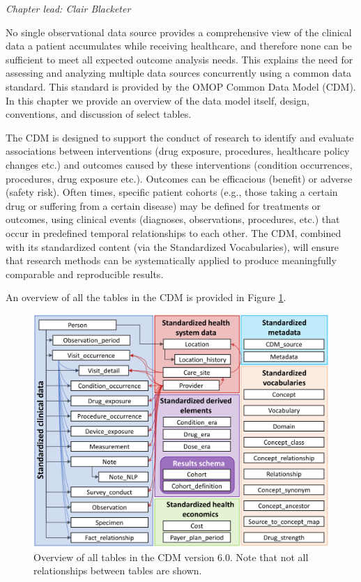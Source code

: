 \documentclass[11pt]{book}
\theoremstyle{definition}
\theoremstyle{definition}
\theoremstyle{definition}
\theoremstyle{remark}
\begin{document}
\emph{Chapter lead: Clair Blacketer}

No single observational data source provides a comprehensive view of the clinical data a patient accumulates while receiving healthcare, and therefore none can be sufficient to meet all expected outcome analysis needs. This explains the need for assessing and analyzing multiple data sources concurrently using a common data standard. This standard is provided by the OMOP Common Data Model (CDM). In this chapter we provide an overview of the data model itself, design, conventions, and discussion of select tables.

The CDM is designed to support the conduct of research to identify and evaluate associations between interventions (drug exposure, procedures, healthcare policy changes etc.) and outcomes caused by these interventions (condition occurrences, procedures, drug exposure etc.). Outcomes can be efficacious (benefit) or adverse (safety risk). Often times, specific patient cohorts (e.g., those taking a certain drug or suffering from a certain disease) may be defined for treatments or outcomes, using clinical events (diagnoses, observations, procedures, etc.) that occur in predefined temporal relationships to each other. The CDM, combined with its standardized content (via the Standardized Vocabularies), will ensure that research methods can be systematically applied to produce meaningfully comparable and reproducible results.

An overview of all the tables in the CDM is provided in Figure \ref{fig:cdmDiagram}.

\begin{figure}
\includegraphics[width=1\linewidth]{images/CommonDataModel/cdmDiagram} \caption{Overview of all tables in the CDM version 6.0. Note that not all relationships between tables are shown.}\label{fig:cdmDiagram}
\end{figure}
\end{document}
